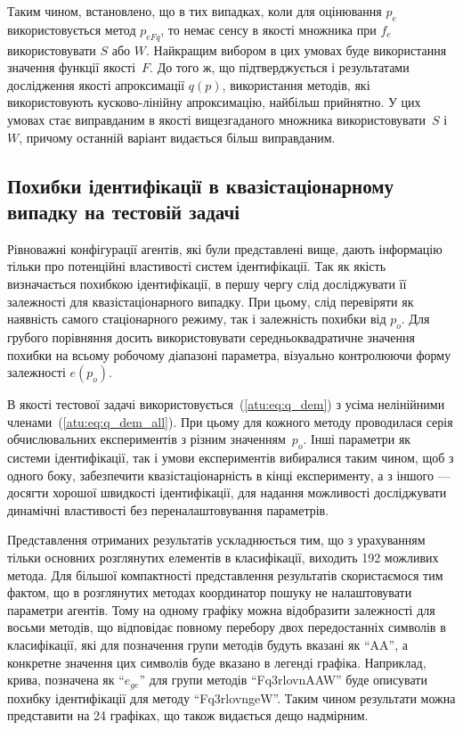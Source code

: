 Таким чином, встановлено, що в тих випадках, коли для оцінювання $p_e$ використовується
метод $p_{eFq}$, то немає сенсу в якості множника при $f_e$
використовувати $S$ або $W$. Найкращим вибором в цих умовах буде
використання значення функції якості~$F$. До того ж, що підтверджується і
результатами дослідження якості апроксимації $q(p)$, використання методів,
які використовують кусково-лінійну апроксимацію, найбільш прийнятно. У цих
умовах стає виправданим в якості вищезгаданого множника використовувати~$S$
і~$W$, причому останній варіант видається більш виправданим.


\subsection{Похибки ідентифікації в квазістаціонарному випадку на тестовій задачі} %

Рівноважні конфігурації агентів, які були представлені вище, дають інформацію тільки про
потенційні властивості систем ідентифікації.
Так як якість визначається похибкою ідентифікації,
в першу чергу слід досліджувати її залежності для
квазістаціонарного випадку.
При цьому, слід перевіряти як наявність самого стаціонарного
режиму, так і залежність похибки від
$ p_o $. Для грубого порівняння досить використовувати
середньоквадратичне значення похибки на всьому робочому
діапазоні параметра, візуально контролюючи форму залежності
$ e (p_o) $.

В якості тестової задачі
використовується~(\ref{atu:eq:q_dem}) з усіма нелінійними членами~(\ref{atu:eq:q_dem_all}).
При цьому для кожного методу
проводилася серія обчислювальних експериментів з різним значенням~$p_o$. Інші
параметри як системи ідентифікації, так і умови експериментів вибиралися таким
чином, щоб з одного боку, забезпечити квазістаціонарність в кінці експерименту, а
з іншого --- досягти хорошої швидкості ідентифікації, для надання можливості
досліджувати динамічні властивості без переналаштовування параметрів.

Представлення отриманих результатів ускладнюється тим, що з урахуванням тільки
основних розглянутих елементів в класифікації, виходить 192 можливих метода.
Для більшої компактності представлення результатів
скористаємося тим фактом, що в розглянутих методах координатор
пошуку не налаштовувати параметри агентів.
Тому на одному графіку можна відобразити залежності для восьми методів,
що відповідає повному перебору двох передостанніх символів в
класифікації, які для позначення групи методів будуть вказані як
``AA'', а конкретне значення цих символів буде вказано в легенді
графіка. Наприклад, крива, позначена як ``$e_{ge}$'' для групи
методів ``Fq3rlovnAAW'' буде описувати похибку ідентифікації для
методу ``Fq3rlovngeW''. Таким чином результати можна представити на
24 графіках, що також видається дещо надмірним.

